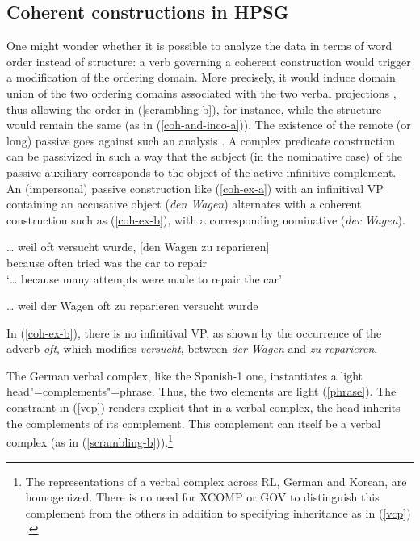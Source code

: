 \documentclass[output=paper]{langsci/langscibook}
\begin{document}
	
	\subsection{Coherent constructions in HPSG}
	
	One might wonder whether it is possible to analyze the data in terms of word order instead of structure: a verb governing a coherent construction would trigger a modification of the ordering domain. More precisely, it would induce domain union of the two ordering domains associated with the two verbal projections \citep{Reape94a}, thus allowing the order in (\ref{scrambling-b}), for instance, while the structure would remain the same (as in (\ref{coh-and-inco-a})). The existence of the remote (or long) passive goes against such an analysis \citep{Kathol98b, Mueller2002b}. A complex predicate construction can be passivized in such a way that the subject (in the nominative case) of the passive auxiliary corresponds to the object of the active infinitive complement. An (impersonal) passive construction like (\ref{coh-ex-a}) with an infinitival VP containing an accusative object (\textit{den Wagen}) alternates with a coherent construction such as (\ref{coh-ex-b}), with a corresponding nominative (\textit{der Wagen}). 
	
	\begin{exe}
		\ex  \label{coh-ex}
		
		\begin{xlist} 
			
			\ex   \label{coh-ex-a}
			\gll \ldots{} weil oft versucht wurde, [den Wagen zu reparieren]\\
            		     {}  because often tried was \spacebr{}the car to repair\\
			\glt `\ldots{} because many attempts were made to repair the car'
			
			\ex   \label{coh-ex-b}
			\ldots{} weil der Wagen oft zu reparieren versucht wurde
		\end{xlist}
		
	\end{exe}
	
	In (\ref{coh-ex-b}), there is no infinitival VP, as shown by the occurrence of the adverb \textit{oft}, which modifies \textit{versucht}, between \textit{der Wagen} and \textit{zu reparieren}.
	
	The German verbal complex, like the Spanish-1 one, instantiates a light head"=complements"=phrase. Thus, the two elements are light (\ref{phrase}). The constraint in (\ref{vcp}) renders explicit that in a verbal complex, the head inherits the complements of its complement. This complement can itself be a verbal complex (as in (\ref{scrambling-b})).\footnote{The representations of a verbal complex across RL, German and Korean, are homogenized. There is no need for XCOMP \citep{Mueller2002b} or GOV \citep{CC1998} to distinguish this complement from the others in addition to specifying inheritance as in (\ref{vcp})  \citep{BW2013}. }
	
\end{document}
